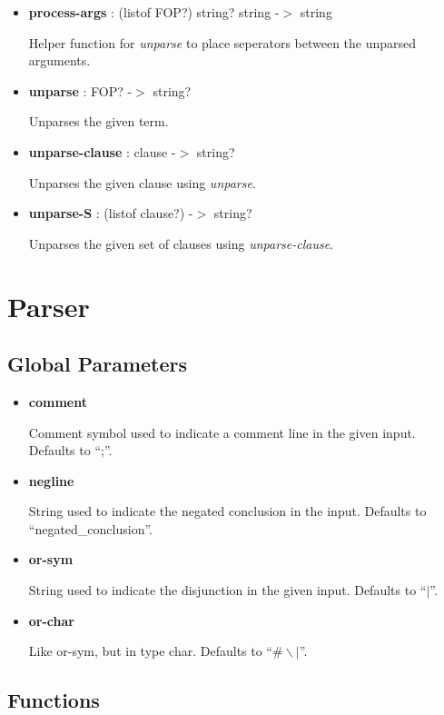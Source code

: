 \documentclass[11pt]{report}
\begin{document}
\begin{appendices}
\begin{itemize}
 \item \textbf{process-args} : (listof FOP?) string? string -$>$ string

Helper function for \textit{unparse} to place seperators between the unparsed arguments.

 \item \textbf{unparse} : FOP? -$>$ string?

Unparses the given term.

 \item \textbf{unparse-clause} : clause -$>$ string?

Unparses the given clause using \textit{unparse}.

 \item \textbf{unparse-S} : (listof clause?) -$>$ string?

Unparses the given set of clauses using \textit{unparse-clause}.
\end{itemize}

\section{Parser}

\subsection{Global Parameters}

\begin{itemize}
 \item \textbf{comment}

Comment symbol used to indicate a comment line in the given input. Defaults to ``;''.

 \item \textbf{negline}

String used to indicate the negated conclusion in the input. Defaults to ``negated\_conclusion''.

 \item \textbf{or-sym}

String used to indicate the disjunction in the given input. Defaults to ``$|$''.

 \item \textbf{or-char}

Like or-sym, but in type char. Defaults to ``$\# \backslash |$''.
\end{itemize}

\subsection{Functions}


\end{appendices}
\end{document}
